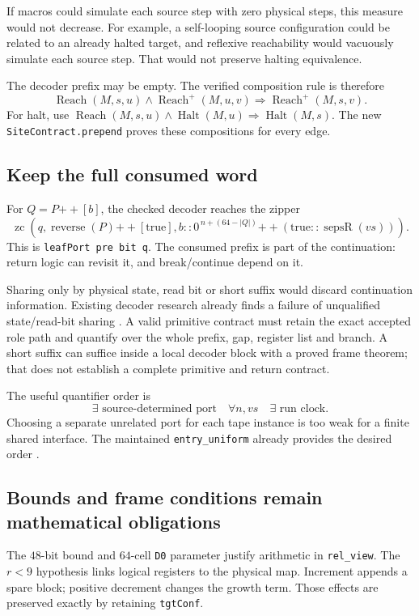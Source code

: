 \documentclass[11pt,letterpaper]{article}
\newcommand{\Halt}{\operatorname{Halt}}
\newcommand{\Reach}{\operatorname{Reach}}
\newcommand{\Reachp}{\operatorname{Reach}^{+}}
\newcommand{\code}[1]{\texttt{#1}}
\begin{document}
If macros could simulate each source step with zero physical steps, this
measure would not decrease. For example, a self-looping source configuration
could be related to an already halted target, and reflexive reachability would
vacuously simulate each source step. That would not preserve halting equivalence.

The decoder prefix may be empty. The verified composition rule is therefore
\[
 \Reach(M,s,u)\land\Reachp(M,u,v)\Longrightarrow\Reachp(M,s,v).
\]
For halt, use
\(\Reach(M,s,u)\land\Halt(M,u)\Rightarrow\Halt(M,s)\).
The new \code{SiteContract.prepend} proves these compositions for every edge.

\subsection{Keep the full consumed word}

For \(Q=P\mathbin{+\!\!+}[b]\), the checked decoder reaches the zipper
\[
 \operatorname{zc}\!\left(
 q,\operatorname{reverse}(P)\mathbin{+\!\!+}[\mathrm{true}],
 b::0^{\,n+(64-|Q|)}
 \mathbin{+\!\!+}(\mathrm{true}::\operatorname{sepsR}(vs))
 \right).
\]
This is \code{leafPort pre bit q}. The consumed prefix is part of the
continuation: return logic can revisit it, and break/continue depend on it.

Sharing only by physical state, read bit or short suffix would discard
continuation information. Existing decoder research already finds a failure
of unqualified state/read-bit sharing \cite{decoder-research}. A valid primitive
contract must retain the exact accepted role path and quantify over the whole
prefix, gap, register list and branch. A short suffix can suffice inside a
local decoder block with a proved frame theorem; that does not establish a
complete primitive and return contract.

The useful quantifier order is
\[
 \exists\text{ source-determined port}\quad
 \forall n,vs\quad\exists\text{ run clock}.
\]
Choosing a separate unrelated port for each tape instance is too weak for a
finite shared interface. The maintained \code{entry\_uniform} already provides
the desired order \cite{decoder}.

\subsection{Bounds and frame conditions remain mathematical obligations}

The \(48\)-bit bound and \(64\)-cell \code{D0} parameter justify arithmetic in
\code{rel\_view}. The \(r<9\) hypothesis links logical registers to the physical
map. Increment appends a spare block; positive decrement changes the growth
term. Those effects are preserved exactly by retaining \code{tgtConf}.
\end{document}
